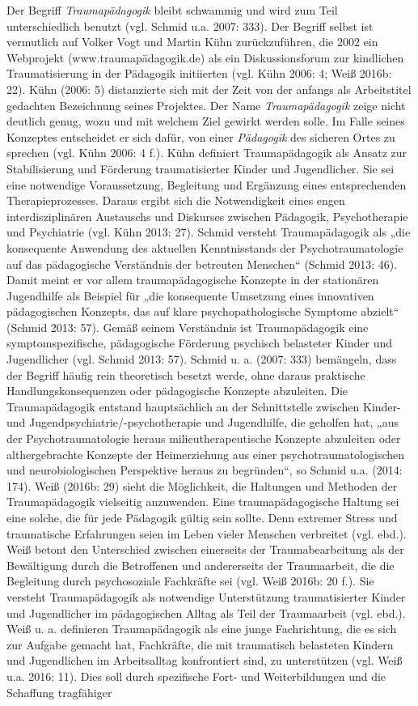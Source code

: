 Der Begriff \textit{Traumapädagogik} bleibt schwammig und wird zum Teil unterschiedlich benutzt (vgl. Schmid u.a. 2007: 333). Der Begriff selbst ist vermutlich auf Volker Vogt und Martin Kühn zurückzuführen, die 2002 ein Webprojekt (www.traumapädagogik.de) als ein Diskussionsforum zur kindlichen Traumatisierung in der Pädagogik initiierten (vgl. Kühn 2006: 4; Weiß 2016b: 22). Kühn (2006: 5) distanzierte sich mit der Zeit von der anfangs als Arbeitstitel gedachten Bezeichnung seines Projektes. Der Name \textit{Traumapädagogik} zeige nicht deutlich genug, wozu und mit welchem Ziel gewirkt werden solle. Im Falle seines Konzeptes entscheidet er sich dafür, von einer \textit{Pädagogik} des sicheren Ortes zu sprechen (vgl. Kühn 2006: 4 f.). Kühn definiert Traumapädagogik als Ansatz zur Stabilisierung und Förderung traumatisierter Kinder und Jugendlicher. Sie sei eine notwendige Voraussetzung, Begleitung und Ergänzung eines entsprechenden Therapieprozesses. Daraus ergibt sich die Notwendigkeit eines engen interdisziplinären Austauschs und Diskurses zwischen Pädagogik, Psychotherapie und Psychiatrie (vgl. Kühn 2013: 27). Schmid versteht Traumapädagogik als „die konsequente Anwendung des aktuellen Kenntnisstands der Psychotraumatologie auf das pädagogische Verständnis der betreuten Menschen“ (Schmid 2013: 46). Damit meint er vor allem traumapädagogische Konzepte in der stationären Jugendhilfe als Beispiel für „die konsequente Umsetzung eines innovativen pädagogischen Konzepts, das auf klare psychopathologische Symptome abzielt“ (Schmid 2013: 57). Gemäß seinem Verständnis ist Traumapädagogik eine symptomspezifische, pädagogische Förderung psychisch belasteter Kinder und Jugendlicher (vgl. Schmid 2013: 57). Schmid u. a. (2007: 333) bemängeln, dass der Begriff häufig rein theoretisch besetzt werde, ohne daraus praktische Handlungskonsequenzen oder pädagogische Konzepte abzuleiten. Die Traumapädagogik entstand hauptsächlich an der Schnittstelle zwischen Kinder- und Jugendpsychiatrie/-psychotherapie und Jugendhilfe, die geholfen hat, „aus der Psychotraumatologie heraus milieutherapeutische Konzepte abzuleiten oder althergebrachte Konzepte der Heimerziehung aus einer psychotraumatologischen und neurobiologischen Perspektive heraus zu begründen“, so Schmid u.a. (2014: 174). Weiß (2016b: 29) sieht die Möglichkeit, die Haltungen und Methoden der Traumapädagogik vielseitig anzuwenden. Eine traumapädagogische Haltung sei eine solche, die für jede Pädagogik gültig sein sollte. Denn extremer Stress und traumatische Erfahrungen seien im Leben vieler Menschen verbreitet (vgl. ebd.). Weiß betont den Unterschied zwischen einerseits der Traumabearbeitung als der Bewältigung durch die Betroffenen und andererseits der Traumaarbeit, die die Begleitung durch psychosoziale Fachkräfte sei (vgl. Weiß 2016b: 20 f.). Sie versteht Traumapädagogik als notwendige Unterstützung traumatisierter Kinder und Jugendlicher im pädagogischen Alltag als Teil der Traumaarbeit (vgl. ebd.). Weiß u. a. definieren Traumapädagogik als eine junge Fachrichtung, die es sich zur Aufgabe gemacht hat, Fachkräfte, die mit traumatisch belasteten Kindern und Jugendlichen im Arbeitsalltag konfrontiert sind, zu unterstützen (vgl. Weiß u.a. 2016: 11). Dies soll durch spezifische Fort- und Weiterbildungen und die Schaffung tragfähiger 